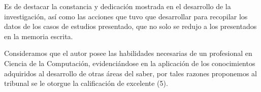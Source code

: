 \begin{opinion}
Es de destacar la constancia y dedicación mostrada en el desarrollo de la investigación, así como las acciones que tuvo que desarrollar para recopilar los datos de los casos de estudios presentado, que no solo se redujo a los presentados en la memoria escrita.  

Consideramos que el autor posee las habilidades necesarias de un profesional en Ciencia de la Computación, evidenciándose en la aplicación de los conocimientos adquiridos al desarrollo de otras áreas del saber, por tales razones proponemos al tribunal se le otorgue la calificación de excelente (5).
\end{opinion}